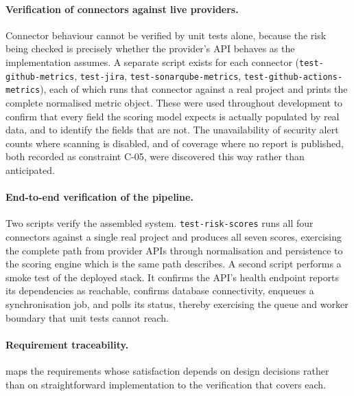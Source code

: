 \paragraph{Verification of connectors against live providers.}
Connector behaviour cannot be verified by unit tests alone, because the risk
being checked is precisely whether the provider's API behaves as the
implementation assumes. A separate script exists for each connector
(\texttt{test-github-metrics}, \texttt{test-jira},
\texttt{test-sonarqube-metrics}, \texttt{test-github-actions-metrics}), each of
which runs that connector against a real project and prints the complete
normalised metric object. These were used throughout development to confirm that
every field the scoring model expects is actually populated by real data, and to
identify the fields that are not. The unavailability of security alert counts
where scanning is disabled, and of coverage where no report is published, both
recorded as constraint C-05, were discovered this way rather than anticipated.

\paragraph{End-to-end verification of the pipeline.}
Two scripts verify the assembled system. \texttt{test-risk-scores} runs all four
connectors against a single real project and produces all seven scores,
exercising the complete path from provider APIs through normalisation and
persistence to the scoring engine which is the same path
 describes. A second script performs a smoke test of
the deployed stack. It confirms the API's health endpoint reports its
dependencies as reachable, confirms database connectivity, enqueues a
synchronisation job, and polls its status, thereby exercising the queue and
worker boundary that unit tests cannot reach.

\paragraph{Requirement traceability.}
 maps the requirements whose satisfaction
depends on design decisions rather than on straightforward implementation to the
verification that covers each.

